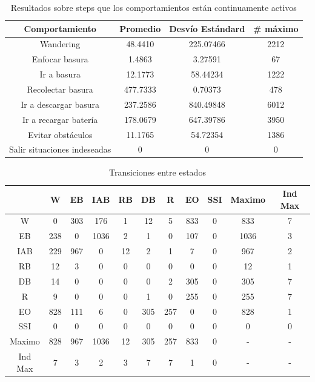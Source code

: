 \begin{table}[ht]
	\begin{center}
		\begin{tabular}{|c|c|c|c|}
			\hline
			Comportamiento & Promedio & Desv\'io Est\'andard & \# m\'aximo \\
			\hline
			Wandering & 48.4410 & 225.07466 & 2212 \\
			Enfocar basura & 1.4863 & 3.27591 & 67 \\
			Ir a basura & 12.1773 & 58.44234 & 1222 \\
			Recolectar basura & 477.7333 & 0.70373 & 478 \\
			Ir a descargar basura & 237.2586 & 840.49848 & 6012 \\
			Ir a recargar bater\'ia & 178.0679 & 647.39786 & 3950 \\
			Evitar obst\'aculos & 11.1765 & 54.72354 & 1386 \\
			Salir situaciones indeseadas & 0 & 0 & 0 \\
			\hline
		\end{tabular}
	\end{center}
	\caption{Resultados sobre steps que los comportamientos est\'an continuamente
					activos}
	\label{behaviours_stats1}
\end{table}

\begin{table}
	\begin{center}
		\begin{tabular}{|c||c|c|c|c|c|c|c|c||c|c|}
		\hline
    	 & W & EB & IAB & RB & DB & R & EO & SSI & Maximo & Ind Max \\
		\hline
		\hline
			W & 0 & 303 & 176 & 1 & 12 & 5 & 833 & 0 & 833 & 7\\
		\hline
			EB & 238 & 0 & 1036 & 2 & 1 & 0 & 107 & 0 & 1036 & 3\\
		\hline
			IAB & 229 & 967 & 0 & 12 & 2 & 1 & 7 & 0 & 967 & 2\\
		\hline
			RB & 12 & 3 & 0 & 0 & 0 & 0 & 0 & 0 & 12 & 1\\
		\hline
			DB & 14 & 0 & 0 & 0 & 0 & 2 & 305 & 0 & 305 & 7\\
		\hline
			R & 9 & 0 & 0 & 0 & 1 & 0 & 255 & 0 & 255 & 7\\
		\hline
			EO & 828 & 111 & 6 & 0 & 305 & 257 & 0 & 0 & 828 & 1\\
		\hline
			SSI & 0 & 0 & 0 & 0 & 0 & 0 & 0 & 0 & 0 & 0\\
		\hline
		\noalign{\smallskip}
		\hline
			Maximo & 828 & 967 & 1036 & 12 & 305 & 257 & 833 & 0 & - & -\\
		\hline
			Ind Max & 7 & 3 & 2 & 3 & 7 & 7 & 1 & 0 & - & -\\
		\hline
		\end{tabular}
	\end{center}
	\caption{Transiciones entre estados}
	\label{transitions}
\end{table}

